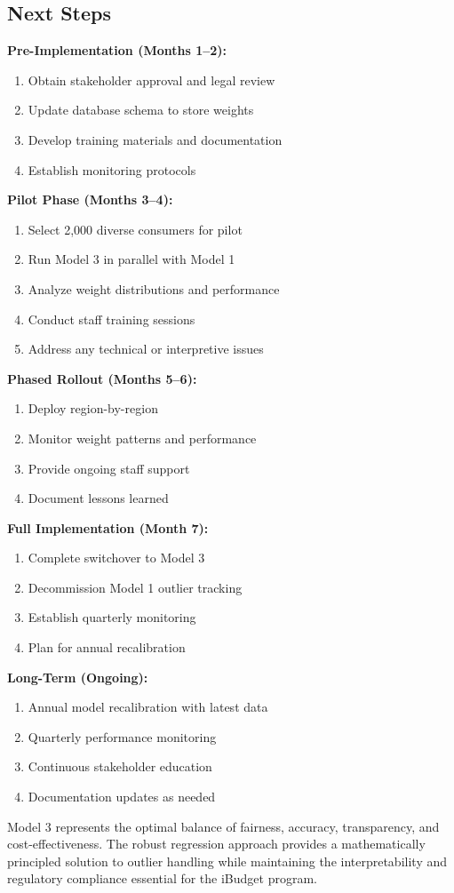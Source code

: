 \subsection{Next Steps}

\textbf{Pre-Implementation (Months 1--2):}
\begin{enumerate}
    \item Obtain stakeholder approval and legal review
    \item Update database schema to store weights
    \item Develop training materials and documentation
    \item Establish monitoring protocols
\end{enumerate}

\textbf{Pilot Phase (Months 3--4):}
\begin{enumerate}
    \item Select 2,000 diverse consumers for pilot
    \item Run Model 3 in parallel with Model 1
    \item Analyze weight distributions and performance
    \item Conduct staff training sessions
    \item Address any technical or interpretive issues
\end{enumerate}

\textbf{Phased Rollout (Months 5--6):}
\begin{enumerate}
    \item Deploy region-by-region
    \item Monitor weight patterns and performance
    \item Provide ongoing staff support
    \item Document lessons learned
\end{enumerate}

\textbf{Full Implementation (Month 7):}
\begin{enumerate}
    \item Complete switchover to Model 3
    \item Decommission Model 1 outlier tracking
    \item Establish quarterly monitoring
    \item Plan for annual recalibration
\end{enumerate}

\textbf{Long-Term (Ongoing):}
\begin{enumerate}
    \item Annual model recalibration with latest data
    \item Quarterly performance monitoring
    \item Continuous stakeholder education
    \item Documentation updates as needed
\end{enumerate}

Model 3 represents the optimal balance of fairness, accuracy, transparency, and cost-effectiveness. The robust regression approach provides a mathematically principled solution to outlier handling while maintaining the interpretability and regulatory compliance essential for the iBudget program.